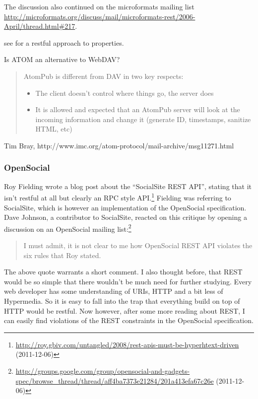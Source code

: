 \documentclass[12pt,a4paper]{scrartcl}		%
\newcommand{\citeurl}[2]{\url{#1} (#2)}
\begin{document}
The discussion also continued on the microformats mailing list
\url{http://microformats.org/discuss/mail/microformats-rest/2006-April/thread.html#217}.

see \cite{Amundsen2010} for a restful approach to properties.

Is ATOM an alternative to WebDAV?

\begin{quote}
  AtomPub is different from DAV in two key respects:
  \begin{itemize}
  \item The client doesn't control where things go, the server does
  \item It is allowed and expected that an AtomPub server will look at the incoming information and change it (generate ID, timestamps, sanitize HTML, etc)
  \end{itemize}
\end{quote}
Tim Bray, http://www.imc.org/atom-protocol/mail-archive/msg11271.html

\subsubsection{OpenSocial}
\label{sec:opensocial}

Roy Fielding wrote a blog post about the ``SocialSite REST API'', stating that
it isn't restful at all but clearly an RPC style
API.\footnote{\citeurl{http://roy.gbiv.com/untangled/2008/rest-apis-must-be-hyperhtext-driven}{2011-12-06}}
Fielding was referring to SocialSite, which is however an implementation of the
OpenSocial specification. Dave Johnson, a contributor to SocialSite, reacted on
this critique by opening a discussion on an OpenSocial mailing
list:\footnote{\citeurl{http://groups.google.com/group/opensocial-and-gadgets-spec/browse_thread/thread/aff4ba7373e21284/201a413efa67c26e}{2011-12-06}}
\begin{quote}
  I must admit, it is not clear to me how OpenSocial REST API violates the six
  rules that Roy stated.
\end{quote}
The above quote warrants a short comment. I also thought before, that REST would
be so simple that there wouldn't be much need for further studying. Every web
developer has some understanding of URIs, HTTP and a bit less of Hypermedia. So
it is easy to fall into the trap that everything build on top of HTTP would be
restful. Now however, after some more reading about REST, I can easily find
violations of the REST constraints in the OpenSocial specification.
\end{document}
